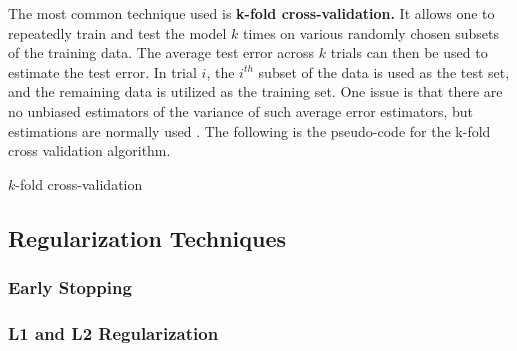\documentclass{article}
\begin{document}
The most common technique used is \textbf{k-fold cross-validation.} It allows one to repeatedly train and test the model $k$ times on various randomly chosen subsets of the training data. The average test error across $k$ trials can then be used to estimate the test error. In trial $i$, the $i^{th}$ subset of the data is used as the test set, and the remaining data is utilized as the training set. One issue is that there are no unbiased estimators of the variance of such average error estimators, but estimations are normally used \citep{Goodfellow-et-al-2016}. The following is the pseudo-code for the k-fold cross validation algorithm.


\begin{algorithm}[h!]
  \caption{$k$-fold cross-validation}\label{k-CrossVal} 
\end{algorithm}

\subsection{Regularization Techniques}%
  \label{sub:Regularization Techniques}

 \subsubsection{Early Stopping}%
  \label{sub:Early Stopping}

\subsubsection{L1 and L2 Regularization}    \label{sub:L1 and L2 Regularization}
\end{document}
